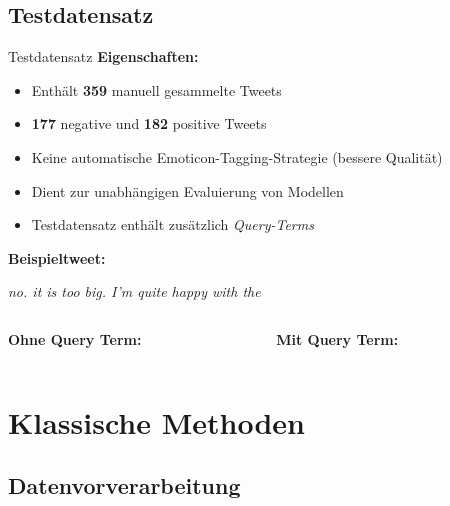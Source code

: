 \documentclass[aspectratio=169]{beamer} %
\begin{document}
\subsection{Testdatensatz}

\begin{frame}{Testdatensatz}
  \textbf{Eigenschaften:}
  \begin{itemize}
      \item Enthält \textbf{359} manuell gesammelte Tweets
      \item \textbf{177} negative und \textbf{182} positive Tweets
      \item Keine automatische Emoticon-Tagging-Strategie (bessere Qualität)
      \item Dient zur unabhängigen Evaluierung von Modellen
      \item Testdatensatz enthält zusätzlich \textit{Query-Terms}
  \end{itemize}

  \vspace{0.5cm}
  \textbf{Beispieltweet:}


  \begin{center}
    \glqq \textit{no. it is too big. I'm quite happy with the \grqq}
    \vspace{0.25cm}
    \begin{columns}
        \begin{column}{0.45\textwidth}
            \textbf{Ohne Query Term: }
        \end{column}
        \begin{column}{0.45\textwidth}
            \textbf{Mit Query Term: }
        \end{column}
    \end{columns}
  \end{center}
\end{frame}


\section{Klassische Methoden}


\subsection{Datenvorverarbeitung}
\end{document}
